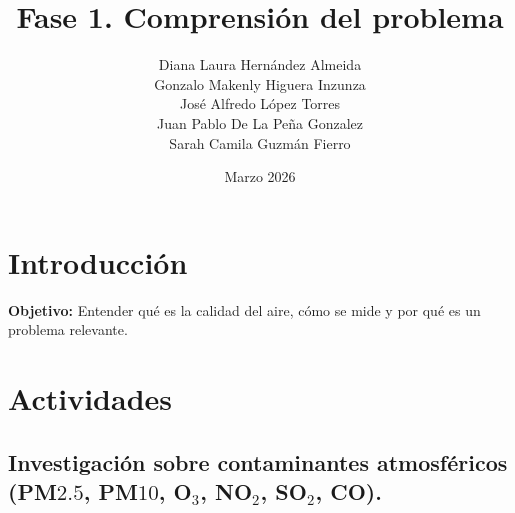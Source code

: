 \documentclass{article}
\title{Fase 1. Comprensión del problema}
\author{
    Diana Laura Hernández Almeida \\
    Gonzalo Makenly Higuera Inzunza \\
    José Alfredo López Torres \\
    Juan Pablo De La Peña Gonzalez \\
    Sarah Camila Guzmán Fierro
}
\date{Marzo 2026}
\begin{document}
\maketitle

\section*{Introducción}

\textbf{Objetivo:} Entender qué es la calidad del aire, cómo se mide y por qué es un problema relevante.

\section*{Actividades}

\subsection{Investigación sobre contaminantes atmosféricos (PM${2.5}$, PM${10}$, O$_3$, NO$_2$, SO$_2$, CO).} 
\end{document}

